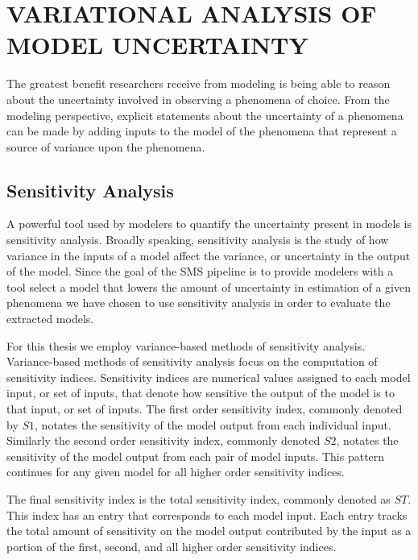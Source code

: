 \chapter{VARIATIONAL ANALYSIS OF MODEL UNCERTAINTY\label{chapter:analysis}}

The greatest benefit researchers receive from modeling is being able to reason about the uncertainty involved in observing a phenomena of choice. From the modeling perspective, explicit statements about the uncertainty of a phenomena can be made by adding inputs to the model of the phenomena that represent a source of variance upon the phenomena.


\section{Sensitivity Analysis\label{sec:sens_analysis}}
A powerful tool used by modelers to quantify the uncertainty present in models is sensitivity analysis. Broadly speaking, sensitivity analysis is the study of how variance in the inputs of a model affect the variance, or uncertainty in the output of the model. Since the goal of the SMS pipeline is to provide modelers with a tool select a model that lowers the amount of uncertainty in estimation of a given phenomena we have chosen to use sensitivity analysis in order to evaluate the extracted models.

For this thesis we employ variance-based methods of sensitivity analysis.
Variance-based methods of sensitivity analysis focus on the computation of sensitivity indices. Sensitivity indices are numerical values assigned to each model input, or set of inputs, that denote how sensitive the output of the model is to that input, or set of inputs. The first order sensitivity index, commonly denoted by $S1$, notates the sensitivity of the model output from each individual input. Similarly the second order sensitivity index, commonly denoted $S2$, notates the sensitivity of the model output from each pair of model inputs. This pattern continues for any given model for all higher order sensitivity indices.

The final sensitivity index is the total sensitivity index, commonly denoted as $ST$. This index has an entry that corresponds to each model input. Each entry tracks the total amount of sensitivity on the model output contributed by the input as a portion of the first, second, and all higher order sensitivity indices.


